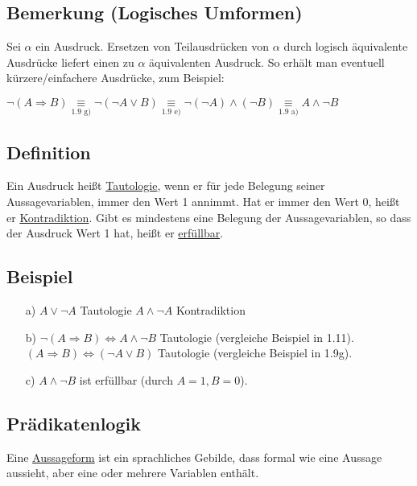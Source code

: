 \documentclass[a4paper, 12pt, twoside] {article}
\begin{document}
\subsection{Bemerkung (Logisches Umformen)}
Sei $\alpha$ ein Ausdruck. Ersetzen von Teilausdrücken von $\alpha$ durch logisch äquivalente Ausdrücke liefert einen zu $\alpha$ äquivalenten Ausdruck. So erhält man eventuell kürzere/einfachere Ausdrücke, zum Beispiel:

$\neg (A \Rightarrow B) \underset{\text{1.9 g})}{\equiv} \neg (\neg A \lor B) \underset{\text{1.9 e)}}{\equiv} \neg (\neg A) \wedge (\neg B) \underset{\text{1.9 a)}}{\equiv} A \wedge \neg B$


\subsection{Definition}
Ein Ausdruck heißt \underline{Tautologie}, wenn er für jede Belegung seiner Aussagevariablen, immer den Wert 1 annimmt. Hat er immer den Wert 0, heißt er \underline{Kontradiktion}. 
Gibt es mindestens eine Belegung der Aussagevariablen, so dass der Ausdruck Wert 1 hat, heißt er \underline{erfüllbar}.

\subsection{Beispiel}
\begin{itemize}
\item[a)] $A \lor \neg A$ Tautologie \newline $A \wedge \neg A$ Kontradiktion

\item[b)] $\neg (A \Rightarrow B ) \Leftrightarrow A \wedge \neg B$ Tautologie (vergleiche Beispiel in 1.11). \newline
$(A \Rightarrow B) \Leftrightarrow (\neg A \lor B)$ Tautologie (vergleiche Beispiel in 1.9g).

\item[c)] $A \wedge \neg B$ ist erfüllbar (durch $A = 1, B = 0$).
\end{itemize}

\subsection*{Prädikatenlogik}
Eine \underline{Aussageform} ist ein sprachliches Gebilde, dass formal wie eine Aussage aussieht, aber eine oder mehrere Variablen enthält.
\end{document}
